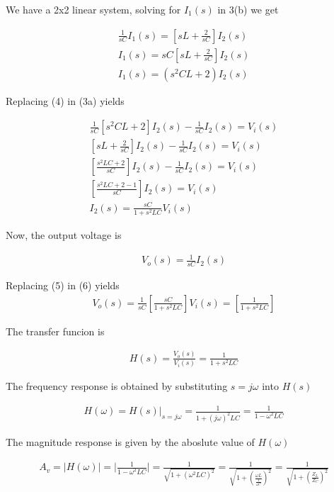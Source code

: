 \documentclass{article}
\begin{document}
\noindent We have a 2x2 linear system, solving for $I_1(s)$ in 3(b) we get

\begin{align}
	\frac{1}{sC} I_1 (s) = \left[ sL + \frac{2}{sC} \right]I_2(s) \nonumber \\
	I_1 (s) = sC\left[ sL + \frac{2}{sC} \right]I_2(s) \nonumber \\
	I_1 (s) = (s^2CL + 2)I_2(s)
\end{align}

\noindent Replacing (4) in (3a) yields

\begin{align}
	\frac{1}{sC} \left[ s^2CL + 2 \right]I_2(s) - \frac{1}{sC}I_2(s)  =  V_i(s) \nonumber \\
	 \left[ sL + \frac{2}{sC} \right] I_2(s) - \frac{1}{sC}I_2(s)  =  V_i(s) \nonumber \\
	 \left[ \frac{s^2LC + 2}{sC} \right]I_2(s) -\frac{1}{sC}I_2(s)  =  V_i(s) \nonumber \\
	 \left[ \frac{s^2LC + 2 - 1}{sC} \right] I_2(s) = V_i(s) \nonumber \\
	 I_2(s) = \frac{sC}{1 + s^2LC}V_i(s)
\end{align} 

\noindent Now, the output voltage is

\begin{align}
	V_o(s) = \frac{1}{sC}I_2(s)
\end{align}

\noindent Replacing (5) in (6) yields
\begin{align}
	V_o(s) = \frac{1}{sC} \left[ \frac{sC}{1 + s^2LC} \right]V_i(s) = \left[ \frac{1}{1 + s^2 LC} \right]
\end{align}

\noindent The transfer funcion is

\begin{align}
	H(s) = \frac{V_o(s)}{V_i(s)} = \frac{1}{1 + s^2 LC}
\end{align}

\noindent The frequency response is obtained by substituting $s=j\omega$ into $H(s)$

\begin{align}
	H(\omega) = H(s) \bigg\rvert_{s = j\omega} = \frac{1}{1 + (j \omega)^2LC} = \frac{1}{1 - \omega^2LC}
\end{align}

\noindent The magnitude response is given by the aboslute value of $H(\omega)$

\begin{align}
	A_v = |H(\omega)| = \bigg\rvert \frac{1}{1 - \omega^2LC} \bigg\rvert = \frac{1}{\sqrt{ 1 + (\omega^2 LC)^2 }} = \frac{1}{\sqrt{ 1 + \left( \frac{\omega L}{ \frac{1}{\omega C} } \right)^2  }} = \frac{1}{\sqrt{ 1 + \left( \frac{Z_L}{Z_C} \right)^2  }}
\end{align}
\end{document}
